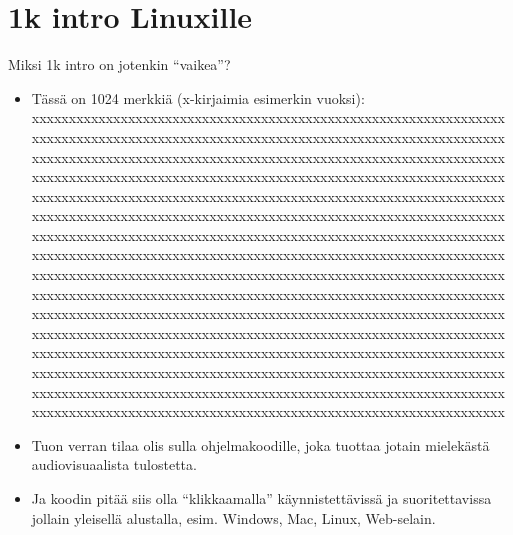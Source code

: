\documentclass[pdf,10pt]{beamer}
\begin{document}
\section{1k intro Linuxille}
\begin{frame}{Miksi 1k intro on jotenkin ``vaikea''?}
  \begin{itemize}
  \item Tässä on 1024 merkkiä (x-kirjaimia esimerkin vuoksi):{\footnotesize \\
    xxxxxxxxxxxxxxxxxxxxxxxxxxxxxxxxxxxxxxxxxxxxxxxxxxxxxxxxxxxxxxxx\\%
    xxxxxxxxxxxxxxxxxxxxxxxxxxxxxxxxxxxxxxxxxxxxxxxxxxxxxxxxxxxxxxxx\\%
    xxxxxxxxxxxxxxxxxxxxxxxxxxxxxxxxxxxxxxxxxxxxxxxxxxxxxxxxxxxxxxxx\\%
    xxxxxxxxxxxxxxxxxxxxxxxxxxxxxxxxxxxxxxxxxxxxxxxxxxxxxxxxxxxxxxxx\\%
    xxxxxxxxxxxxxxxxxxxxxxxxxxxxxxxxxxxxxxxxxxxxxxxxxxxxxxxxxxxxxxxx\\%
    xxxxxxxxxxxxxxxxxxxxxxxxxxxxxxxxxxxxxxxxxxxxxxxxxxxxxxxxxxxxxxxx\\%
    xxxxxxxxxxxxxxxxxxxxxxxxxxxxxxxxxxxxxxxxxxxxxxxxxxxxxxxxxxxxxxxx\\%
    xxxxxxxxxxxxxxxxxxxxxxxxxxxxxxxxxxxxxxxxxxxxxxxxxxxxxxxxxxxxxxxx\\%
    xxxxxxxxxxxxxxxxxxxxxxxxxxxxxxxxxxxxxxxxxxxxxxxxxxxxxxxxxxxxxxxx\\%
    xxxxxxxxxxxxxxxxxxxxxxxxxxxxxxxxxxxxxxxxxxxxxxxxxxxxxxxxxxxxxxxx\\%
    xxxxxxxxxxxxxxxxxxxxxxxxxxxxxxxxxxxxxxxxxxxxxxxxxxxxxxxxxxxxxxxx\\%
    xxxxxxxxxxxxxxxxxxxxxxxxxxxxxxxxxxxxxxxxxxxxxxxxxxxxxxxxxxxxxxxx\\%
    xxxxxxxxxxxxxxxxxxxxxxxxxxxxxxxxxxxxxxxxxxxxxxxxxxxxxxxxxxxxxxxx\\%
    xxxxxxxxxxxxxxxxxxxxxxxxxxxxxxxxxxxxxxxxxxxxxxxxxxxxxxxxxxxxxxxx\\%
    xxxxxxxxxxxxxxxxxxxxxxxxxxxxxxxxxxxxxxxxxxxxxxxxxxxxxxxxxxxxxxxx\\%
    xxxxxxxxxxxxxxxxxxxxxxxxxxxxxxxxxxxxxxxxxxxxxxxxxxxxxxxxxxxxxxxx\\%
}
    \item Tuon verran tilaa olis sulla ohjelmakoodille, joka tuottaa
      jotain mielekästä audiovisuaalista tulostetta.
    \item Ja koodin pitää siis olla ``klikkaamalla'' käynnistettävissä
      ja suoritettavissa jollain yleisellä alustalla, esim. Windows,
      Mac, Linux, Web-selain.
  \end{itemize}
\end{frame}
\end{document}
